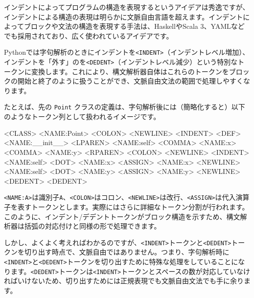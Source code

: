 インデントによってプログラムの構造を表現するというアイデアは秀逸ですが、インデントによる構造の表現は明らかに文脈自由言語を超えます。インデントによってブロックや文法の構造を表現する手法は、HaskellやScala 3、YAMLなどでも採用されており、広く使われているアイデアです。

Pythonでは字句解析のときにインデントを\texttt{\textless{}INDENT\textgreater{}}（インデントレベル増加）、インデントを「外す」のを\texttt{\textless{}DEDENT\textgreater{}}（インデントレベル減少）という特別なトークンに変換します。これにより、構文解析器自体はこれらのトークンをブロックの開始と終了のように扱うことができ、文脈自由文法の範囲で処理しやすくなります。

たとえば、先の \texttt{Point}
クラスの定義は、字句解析後には（簡略化すると）以下のようなトークン列として扱われるイメージです。

\begin{codescreen}{}
<CLASS> <NAME:Point> <COLON> <NEWLINE>
<INDENT>
  <DEF> <NAME:__init__>
  <LPAREN> <NAME:self> <COMMA> <NAME:x> <COMMA> <NAME:y> <RPAREN>
  <COLON> <NEWLINE>
  <INDENT>
    <NAME:self> <DOT> <NAME:x> <ASSIGN> <NAME:x> <NEWLINE>
    <NAME:self> <DOT> <NAME:y> <ASSIGN> <NAME:y> <NEWLINE>
  <DEDENT>
<DEDENT>
\end{codescreen}

\texttt{\textless{}NAME:A\textgreater{}}は識別子\texttt{A}、\texttt{\textless{}COLON\textgreater{}}はコロン、\texttt{\textless{}NEWLINE\textgreater{}}は改行、\texttt{\textless{}ASSIGN\textgreater{}}は代入演算子を表すトークンとします。実際にはさらに詳細なトークン分割が行われます。このように、インデント/デデントトークンがブロック構造を示すため、構文解析器は括弧の対応付けと同様の形で処理できます。

しかし、よくよく考えればわかるのですが、\texttt{\textless{}INDENT\textgreater{}}トークンと\texttt{\textless{}DEDENT\textgreater{}}トークンを切り出す時点で、文脈自由ではありません。つまり、字句解析時に\texttt{\textless{}INDENT\textgreater{}}と\texttt{\textless{}DEDENT\textgreater{}}トークンを切り出すために特殊な処理をしていることになります。\texttt{\textless{}DEDENT\textgreater{}}トークンは\texttt{\textless{}INDENT\textgreater{}}トークンとスペースの数が対応していなければいけないため、切り出すためには正規表現でも文脈自由文法でも手に余ります。

